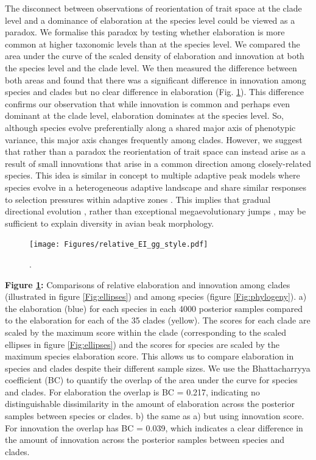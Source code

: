 \documentclass[12pt,letterpaper]{article}
\begin{document}
The disconnect between observations of reorientation of trait space at the clade level and a dominance of elaboration at the species level could be viewed as a paradox.
We formalise this paradox by testing whether elaboration is more common at higher taxonomic levels than at the species level.
We compared the area under the curve of the scaled density of elaboration and innovation at both the species level and the clade level.
We then measured the difference between both areas and found that there was a significant difference in innovation among species and clades but no clear difference in elaboration (Fig. \ref{Fig:relative_EI}).
This difference confirms our observation that while innovation is common and perhaps even dominant at the clade level, elaboration dominates at the species level. So, although species evolve preferentially along a shared major axis of phenotypic variance, this major axis changes frequently among clades.
However, we suggest that rather than a paradox the reorientation of trait space can instead arise as a result of small innovations that arise in a common direction among closely-related species.
This idea is similar in concept to multiple adaptive peak models where species evolve in a heterogeneous adaptive landscape and share similar responses to selection pressures within adaptive zones \cite{hansen1997stabilizing}.
This implies that gradual directional evolution \cite{pagel2022general}, rather than exceptional megaevolutionary jumps \cite{venditti2011multiple,cooney2017mega}, may be sufficient to explain diversity in avian beak morphology.

\begin{figure}[!htbp]
\centering
   \texttt{[image: Figures/relative\_EI\_gg\_style.pdf]}
\caption{.}
\label{Fig:relative_EI}
\end{figure}

\bigskip

\noindent \textbf{Figure \ref{Fig:relative_EI}:} Comparisons of relative elaboration and innovation among clades (illustrated in figure \ref{Fig:ellipses}) and among species (figure \ref{Fig:phylogeny}).
a) the elaboration (blue) for each species in each 4000 posterior samples compared to the elaboration for each of the 35 clades (yellow).
The scores for each clade are scaled by the maximum score within the clade (corresponding to the scaled ellipses in figure \ref{Fig:ellipses}) and the scores for species are scaled by the maximum species elaboration score.
This allows us to compare elaboration in species and clades despite their different sample sizes.
We use the Bhattacharryya coefficient (BC) to quantify the overlap of the area under the curve for species and clades. 
For elaboration the overlap is BC = 0.217, indicating no distinguishable dissimilarity in the amount of elaboration across the posterior samples between species or clades. 
b) the same as a) but using innovation score. 
For innovation the overlap has BC = 0.039, which indicates a clear difference in the amount of innovation across the posterior samples between species and clades.
\end{document}
